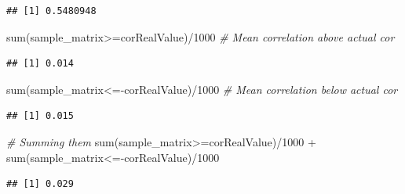 \documentclass[
  notitlepage,
  onecolumn,
  openany]{book}
\newenvironment{Shaded}{\begin{snugshade}}{\end{snugshade}}
\newcommand{\CommentTok}[1]{\textcolor[rgb]{0.56,0.35,0.01}{\textit{#1}}}
\newcommand{\DecValTok}[1]{\textcolor[rgb]{0.00,0.00,0.81}{#1}}
\newcommand{\DocumentationTok}[1]{\textcolor[rgb]{0.56,0.35,0.01}{\textbf{\textit{#1}}}}
\newcommand{\FunctionTok}[1]{\textcolor[rgb]{0.00,0.00,0.00}{#1}}
\newcommand{\NormalTok}[1]{#1}
\newcommand{\OtherTok}[1]{\textcolor[rgb]{0.56,0.35,0.01}{#1}}
\newcommand{\SpecialCharTok}[1]{\textcolor[rgb]{0.00,0.00,0.00}{#1}}
\begin{document}
\begin{Shaded}
\end{Shaded}

\begin{verbatim}
## [1] 0.5480948
\end{verbatim}

\begin{Shaded}
\begin{Highlighting}[]
\FunctionTok{sum}\NormalTok{(sample\_matrix}\SpecialCharTok{\textgreater{}=}\NormalTok{corRealValue)}\SpecialCharTok{/}\DecValTok{1000} \CommentTok{\# Mean correlation above actual cor}
\end{Highlighting}
\end{Shaded}

\begin{verbatim}
## [1] 0.014
\end{verbatim}

\begin{Shaded}
\begin{Highlighting}[]
\FunctionTok{sum}\NormalTok{(sample\_matrix}\SpecialCharTok{\textless{}={-}}\NormalTok{corRealValue)}\SpecialCharTok{/}\DecValTok{1000} \CommentTok{\# Mean correlation below actual cor}
\end{Highlighting}
\end{Shaded}

\begin{verbatim}
## [1] 0.015
\end{verbatim}

\begin{Shaded}
\begin{Highlighting}[]
\CommentTok{\# Summing them}
\FunctionTok{sum}\NormalTok{(sample\_matrix}\SpecialCharTok{\textgreater{}=}\NormalTok{corRealValue)}\SpecialCharTok{/}\DecValTok{1000} \SpecialCharTok{+} \FunctionTok{sum}\NormalTok{(sample\_matrix}\SpecialCharTok{\textless{}={-}}\NormalTok{corRealValue)}\SpecialCharTok{/}\DecValTok{1000}
\end{Highlighting}
\end{Shaded}

\begin{verbatim}
## [1] 0.029
\end{verbatim}
\end{document}
